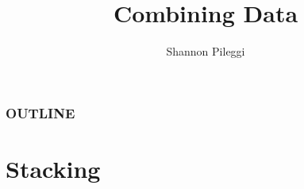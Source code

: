 





\title[Lecture 7]{Combining Data}
\author[Pileggi]{Shannon Pileggi}


\date{}




\begin{frame}
\titlepage
\end{frame}

\begin{frame}
\frametitle{OUTLINE\qquad\qquad\qquad} \tableofcontents[hideallsubsections]
\end{frame}


\section[Stacking]{Stacking}
